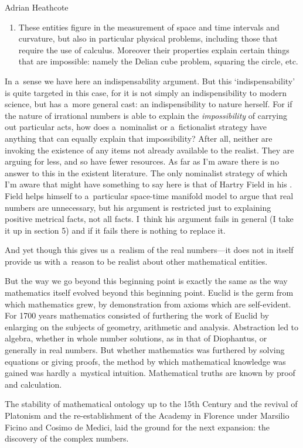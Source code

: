 \begin{artengenv}{Adrian Heathcote}
\begin{enumerate}[label=\emph{\alph*})]
  \item These entities figure in the measurement of space and time intervals  and curvature, but also in particular physical problems, including those that require the use of calculus. Moreover their properties explain certain things that are impossible: namely the Delian cube problem, squaring the circle, etc.
 \end{enumerate}
In a~sense we have here an indispensability argument. But this `indispensability' is quite targeted in this case, for it is not simply an indispensibility to modern science, but has a~more general cast: an indispensibility to nature herself. For if the nature of irrational numbers is able to explain the \textit{impossibility} of carrying out particular acts, how does a~nominalist or a~fictionalist strategy have anything that can equally explain that impossibility? After all, neither are invoking the existence of any items not already available to the realist. They are arguing for less, and so have fewer resources. As far as I'm aware there is no answer to this in the existent literature. The only nominalist strategy of which I'm aware that might have something to say here is that of Hartry Field in his \parencite*{field_science_1980}. Field helps himself to a~particular space-time manifold model to argue that real numbers are unnecessary, but his argument is restricted just to explaining positive metrical facts, not all facts. I~think his argument fails in general (I take it up in section 5) and if it fails there is nothing to replace it.

And yet though this gives us a~realism of the real numbers---it does not in itself provide us with a~reason to be realist about other mathematical entities.

But the way we go beyond this beginning point is exactly the same as the way mathematics itself evolved beyond this beginning point. Euclid is the germ from which mathematics grew, by demonstration from axioms which are self-evident. For 1700 years mathematics consisted of furthering the work of Euclid by enlarging on the subjects of geometry, arithmetic and analysis. Abstraction led to algebra, whether in whole number solutions, as in that of Diophantus, or generally in real numbers. But whether mathematics was furthered by solving equations or giving proofs, the method by which mathematical knowledge was gained was hardly a~mystical intuition. Mathematical truths are known by proof and calculation.

The stability of mathematical ontology up to the 15th Century and the revival of Platonism and the re-establishment of the Academy in Florence under Marsilio Ficino and Cosimo de Medici, laid the ground for the next expansion: the discovery of the complex numbers.


\end{artengenv}
